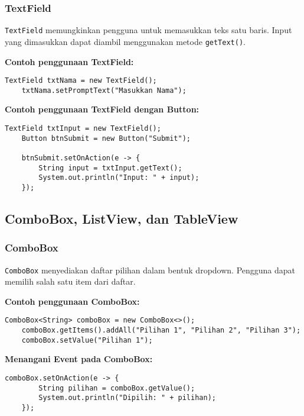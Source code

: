 \subsubsection{TextField}

\texttt{TextField} memungkinkan pengguna untuk memasukkan teks satu baris. Input yang dimasukkan dapat diambil menggunakan metode \texttt{getText()}.

\textbf{Contoh penggunaan TextField:}
\begin{lstlisting}[style=JavaStyle, caption=Membuat TextField dalam JavaFX]
	TextField txtNama = new TextField();
	txtNama.setPromptText("Masukkan Nama");
\end{lstlisting}

\textbf{Contoh penggunaan TextField dengan Button:}
\begin{lstlisting}[style=JavaStyle, caption=Mengambil Input dari TextField]
	TextField txtInput = new TextField();
	Button btnSubmit = new Button("Submit");
	
	btnSubmit.setOnAction(e -> {
		String input = txtInput.getText();
		System.out.println("Input: " + input);
	});
\end{lstlisting}

\subsection{ComboBox, ListView, dan TableView}

\subsubsection{ComboBox}

\texttt{ComboBox} menyediakan daftar pilihan dalam bentuk dropdown. Pengguna dapat memilih salah satu item dari daftar.

\textbf{Contoh penggunaan ComboBox:}
\begin{lstlisting}[style=JavaStyle, caption=Membuat ComboBox dalam JavaFX]
	ComboBox<String> comboBox = new ComboBox<>();
	comboBox.getItems().addAll("Pilihan 1", "Pilihan 2", "Pilihan 3");
	comboBox.setValue("Pilihan 1");
\end{lstlisting}

\textbf{Menangani Event pada ComboBox:}
\begin{lstlisting}[style=JavaStyle, caption=Menampilkan Pilihan dari ComboBox]
	comboBox.setOnAction(e -> {
		String pilihan = comboBox.getValue();
		System.out.println("Dipilih: " + pilihan);
	});
\end{lstlisting}

